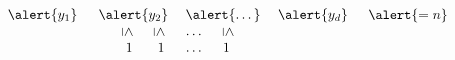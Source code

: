 \begin{frame}
\begin{exampleblock}{}
\begin{displaymath}
\begin{array}{ccccc}
                & & & \begin{array}{cccc}  \alert{y_1}\;\;&\alert{y_2}&\;\alert{\dots}\;&\alert{y_d} \end{array}&\alert{=n} \\
                & & & \begin{array}{cccc}  
                \;\rotatebox[origin=c]{-90}{$\leq$}\;&
                \;\rotatebox[origin=c]{-90}{$\leq$}\;&
                \;\dots\;&
                \;\rotatebox[origin=c]{-90}{$\leq$}\; 
                \end{array}&\\
                & & & \begin{array}{cccc}  \;1\;\;&\;1\;&\;\dots\;&\;1\; \end{array}&
            \end{array}
        \end{displaymath}
    \end{exampleblock}
\end{frame}


